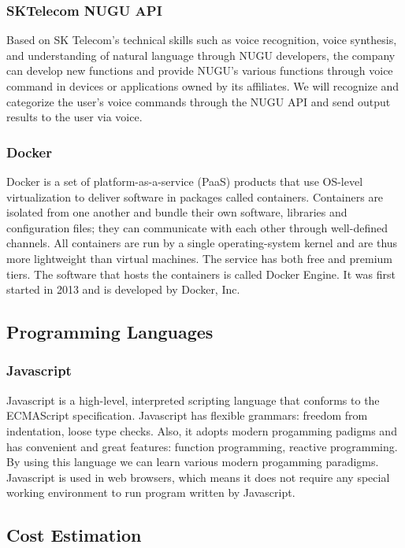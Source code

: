 \documentclass[conference,compsoc]{IEEEtran}
\begin{document}
\subsubsection{SKTelecom NUGU API}

Based on SK Telecom's technical skills such as voice recognition, voice synthesis, and understanding of natural language through NUGU developers, the company can develop new functions and provide NUGU's various functions through voice command in devices or applications owned by its affiliates. We will recognize and categorize the user's voice commands through the NUGU API and send output results to the user via voice.

\subsubsection{Docker}

Docker is a set of platform-as-a-service (PaaS) products that use OS-level virtualization to deliver software in packages called containers. Containers are isolated from one another and bundle their own software, libraries and configuration files; they can communicate with each other through well-defined channels. All containers are run by a single operating-system kernel and are thus more lightweight than virtual machines. The service has both free and premium tiers. The software that hosts the containers is called Docker Engine. It was first started in 2013 and is developed by Docker, Inc. 

\subsection{Programming Languages}

\subsubsection{Javascript}

Javascript is a high-level, interpreted scripting language that conforms to the ECMAScript specification. Javascript has flexible grammars: freedom from indentation, loose type checks. Also, it adopts modern progamming padigms and has convenient and great features: function programming, reactive programming. By using this language we can learn various modern progamming paradigms. Javascript is used in web browsers, which means it does not require any special working environment to run program written by Javascript.

\subsection{Cost Estimation}
\end{document}
